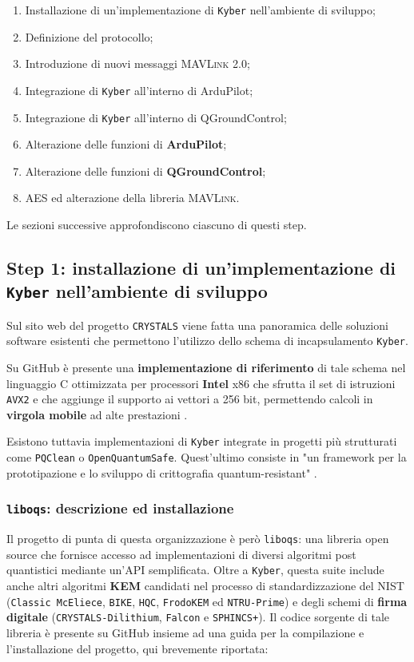 \documentclass[a4paper, 12pt, oneside]{article}
\theoremstyle{definition}
\begin{document}
\begin{enumerate}
    \item Installazione di un'implementazione di \texttt{Kyber} nell'ambiente di sviluppo;
    \item Definizione del protocollo;
    \item Introduzione di nuovi messaggi \textsc{MAVLink} 2.0;
    \item Integrazione di \texttt{Kyber} all'interno di ArduPilot;
    \item Integrazione di \texttt{Kyber} all'interno di QGroundControl;
    \item Alterazione delle funzioni di \textbf{ArduPilot};
    \item Alterazione delle funzioni di \textbf{QGroundControl};
    \item AES ed alterazione della libreria \textsc{MAVLink}.
\end{enumerate}

Le sezioni successive approfondiscono ciascuno di questi step.

\subsection{Step 1: installazione di un'implementazione di \texttt{Kyber} nell'ambiente di sviluppo}
Sul sito web del progetto \texttt{CRYSTALS} \cite{crystals-software} viene fatta una panoramica delle soluzioni software esistenti che permettono l'utilizzo dello schema di incapsulamento \texttt{Kyber}.

Su GitHub è presente una \textbf{implementazione di riferimento} \cite{kyber-reference} di tale schema nel linguaggio C ottimizzata per processori \textbf{Intel} x86 che sfrutta il set di istruzioni \texttt{AVX2} e che aggiunge il supporto ai vettori a 256 bit, permettendo calcoli in \textbf{virgola mobile} ad alte prestazioni \cite{intel-avx2}.

Esistono tuttavia implementazioni di \texttt{Kyber} integrate in progetti più strutturati come \texttt{PQClean} o \texttt{OpenQuantumSafe}. Quest'ultimo consiste in "un framework per la prototipazione e lo sviluppo di crittografia quantum-resistant" \cite{oqs}.

\subsubsection{\texttt{liboqs}: descrizione ed installazione}
Il progetto di punta di questa organizzazione è però \texttt{liboqs}: una libreria open source che fornisce accesso ad implementazioni di diversi algoritmi post quantistici mediante un'API semplificata. Oltre a \texttt{Kyber}, questa suite include anche altri algoritmi \cite{liboqs-algorithms} \textbf{KEM} candidati nel processo di standardizzazione del NIST (\texttt{Classic McEliece}, \texttt{BIKE}, \texttt{HQC}, \texttt{FrodoKEM} ed \texttt{NTRU-Prime}) e degli schemi di \textbf{firma digitale} (\texttt{CRYSTALS-Dilithium}, \texttt{Falcon} e \texttt{SPHINCS+}). Il codice sorgente di tale libreria è presente su GitHub \cite{liboqs-github} insieme ad una guida per la compilazione e l'installazione del progetto, qui brevemente riportata:
\end{document}
